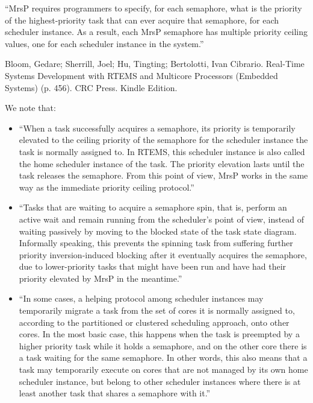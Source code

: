 ``MrsP requires programmers to specify,
for each semaphore,
what is the priority of the highest-priority task
that can ever acquire that semaphore,
for each scheduler instance.
As a result,
each MrsP semaphore has multiple priority ceiling values,
one for each scheduler instance in the system.''

Bloom, Gedare; Sherrill, Joel; Hu, Tingting; Bertolotti, Ivan Cibrario. Real-Time Systems Development with RTEMS and Multicore Processors (Embedded Systems) (p. 456). CRC Press. Kindle Edition.

We note that:
\begin{itemize}
  \item
    ``When a task successfully acquires a semaphore,
      its priority is temporarily elevated
      to the ceiling priority of the semaphore
      for the scheduler instance the task is normally assigned to.
      In RTEMS,
      this scheduler instance is also called
      the home scheduler instance of the task.
      The priority elevation lasts until the task releases the semaphore.
      From this point of view,
      MrsP works in the same way as the immediate priority ceiling  protocol.''
  \item
    ``Tasks that are waiting to acquire a semaphore spin,
      that is,
      perform an active wait
      and remain running from the scheduler’s point of view,
      instead of waiting passively by
      moving to the blocked state of the task state diagram.
      Informally speaking,
      this prevents the spinning task from
      suffering further priority inversion-induced blocking
      after it eventually acquires the  semaphore,
      due to lower-priority tasks that might have been run
      and have  had their priority elevated by MrsP in the meantime.''
  \item
    ``In some cases,
      a helping protocol among scheduler instances
      may temporarily migrate a task from
      the set of cores it is normally assigned to,
      according to the partitioned or clustered scheduling approach,
      onto other cores.
      In the most basic case,
      this happens when the task is preempted
      by a higher priority task while it holds a semaphore,
      and on the other core there is a task waiting for the same semaphore.
      In other words,
      this also means that a task  may temporarily execute
      on cores that are not managed by its own home  scheduler instance,
      but belong to other scheduler instances
      where there is  at least another task that shares a semaphore with it.''
\end{itemize}

